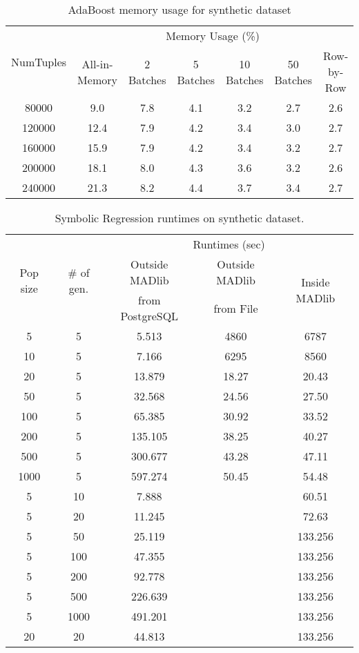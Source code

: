 \begin{table}[!htbp]
\small
\centering
\begin{tabular}{|c|c|c|c|c|c|c|}
\hline
\multirow{2}{*}{NumTuples} & \multicolumn{6}{|c|}{Memory Usage (\%)}\\
\cline{2-7}
& All-in-Memory & 2 Batches & 5 Batches & 10 Batches & 50 Batches & Row-by-Row\\
\hline
80000& 9.0&7.8&4.1 &3.2 &2.7&2.6 \\
\hline
120000& 12.4&7.9 &4.2 &3.4&3.0 &2.7 \\
\hline
160000& 15.9&7.9 &4.2 &3.4 &3.2 &2.7 \\
\hline
200000& 18.1&8.0 &4.3 &3.6 &3.2 &2.6 \\
\hline
240000& 21.3&8.2 &4.4 &3.7 &3.4 &2.7 \\
\hline
\end{tabular}
\caption{AdaBoost memory usage for synthetic dataset}
\label{tab:adaSynth2}
\end{table}


\begin{table}[!htbp]
\small
\centering
\begin{tabular}{|c|c|c|c|c|}
\hline
\multirow{3}{*}{Pop size} & \multirow{3}{*}{\# of gen.} & \multicolumn{3}{|c|}{Runtimes (sec)}\\
\cline{3-5}
& &Outside MADlib&Outside MADlib&\multirow{2}{*}{Inside MADlib}\\
& &from PostgreSQL&from File&\\
\hline
5 & 5 & 5.513 & 4860 & 6787 \\ \hline
10& 5 & 7.166 & 6295 & 8560 \\\hline
20& 5 & 13.879 &18.27 &20.43 \\\hline
50& 5 & 32.568 &24.56 &27.50 \\\hline
100& 5 & 65.385 &30.92 &33.52 \\\hline
200& 5 & 135.105 &38.25 &40.27 \\\hline
500& 5 & 300.677 &43.28 &47.11 \\\hline
1000& 5 & 597.274 &50.45 &54.48 \\\hline
5& 10 & 7.888 & & 60.51 \\\hline
5& 20 & 11.245 &  &72.63 \\\hline
5& 50 & 25.119 &  &133.256 \\\hline
5& 100 & 47.355 &  &133.256 \\\hline
5& 200 & 92.778 &  &133.256 \\\hline
5& 500 & 226.639 &  &133.256 \\\hline
5& 1000 & 491.201 &  &133.256 \\\hline
20& 20 & 44.813 &  &133.256 \\
\hline
\end{tabular}
\caption{Symbolic Regression runtimes on synthetic dataset.}
\label{tab:GPruntimes}
\end{table}


